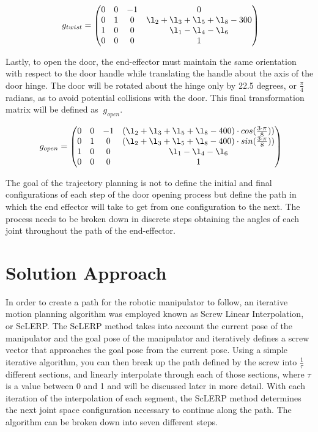 \documentclass[11pt]{article}
\begin{document}
$$
\  g_{twist} = \begin{pmatrix}
0&0&-1&0\\
0&1&0&\l_2+\l_3+\l_5+\l_8 - 300\\
1&0&0&\l_1-\l_4-\l_6\\
0&0&0&1\\
\end{pmatrix}
$$
\newline

Lastly, to open the door, the end-effector must maintain the same orientation with respect to the door handle while translating the handle about the axis of the door hinge.  The door will be rotated about the hinge only by 22.5 degrees, or $\frac{\pi}{4}$ radians, as to avoid potential collisions with the door. This final transformation matrix will be defined as $\ g_{open}$.

$$
\  g_{open} = \begin{pmatrix}
0&0&-1&(\l_2 + \l_3 + \l_5+\l_8 - 400)\cdot cos(\frac{3\cdot\pi}{8}))\\
0&1&0&(\l_2 + \l_3 + \l_5+\l_8 - 400)\cdot sin(\frac{3\cdot\pi}{8}))\\
1&0&0&\l_1-\l_4-\l_6\\
0&0&0&1\\
\end{pmatrix}
$$
\newline

The goal of the trajectory planning is not to define the initial and final configurations of each step of the door opening process but define the path in which the end effector will take to get from one configuration to the next. The process needs to be broken down in discrete steps obtaining the angles of each joint throughout the path of the end-effector. 


\section{Solution Approach}
In order to create a path for the robotic manipulator to follow, an iterative motion planning algorithm was employed known as Screw Linear Interpolation, or ScLERP. The ScLERP method takes into account the current pose of the manipulator and the goal pose of the manipulator and iteratively defines a screw vector that approaches the goal pose from the current pose. Using a simple iterative algorithm, you can then break up the path defined by the screw into $\frac{1}{\tau}$ different sections, and linearly interpolate through each of those sections, where $\tau$ is a value between 0 and 1 and will be discussed later in more detail. With each iteration of the interpolation of each segment, the ScLERP method determines the next joint space configuration necessary to continue along the path. The algorithm can be broken down into seven different steps. 
\newline
\end{document}
